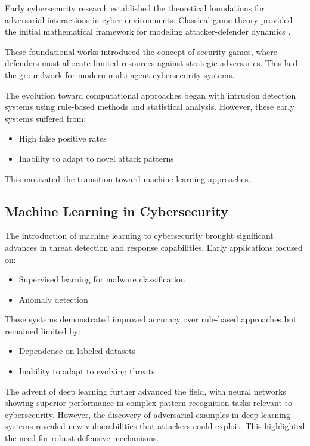 \documentclass[12pt,twoside]{article}
\theoremstyle{definition}
\theoremstyle{plain}
\begin{document}
Early cybersecurity research established the theoretical foundations for adversarial interactions in cyber environments. Classical game theory provided the initial mathematical framework for modeling attacker-defender dynamics \citep{alpcan2010network}. 

These foundational works introduced the concept of security games, where defenders must allocate limited resources against strategic adversaries. This laid the groundwork for modern multi-agent cybersecurity systems.

The evolution toward computational approaches began with intrusion detection systems using rule-based methods and statistical analysis. However, these early systems suffered from:
\begin{itemize}
    \item High false positive rates
    \item Inability to adapt to novel attack patterns \citep{sommer2010outside}
\end{itemize}

This motivated the transition toward machine learning approaches.

\subsection{Machine Learning in Cybersecurity}

The introduction of machine learning to cybersecurity brought significant advances in threat detection and response capabilities. Early applications focused on:
\begin{itemize}
    \item Supervised learning for malware classification
    \item Anomaly detection \citep{sommer2010outside}
\end{itemize}

These systems demonstrated improved accuracy over rule-based approaches but remained limited by:
\begin{itemize}
    \item Dependence on labeled datasets
    \item Inability to adapt to evolving threats
\end{itemize}

The advent of deep learning further advanced the field, with neural networks showing superior performance in complex pattern recognition tasks relevant to cybersecurity. However, the discovery of adversarial examples in deep learning systems \citep{goodfellow2014explaining} revealed new vulnerabilities that attackers could exploit. This highlighted the need for robust defensive mechanisms.
\end{document}
